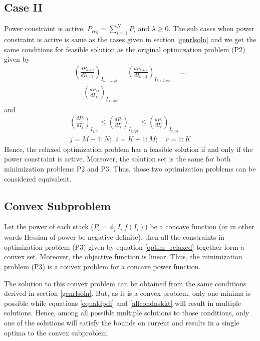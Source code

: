 \documentclass[twocolumn]{autart}
\begin{document}
\subsection*{Case II}
Power constraint is active: $P_{req} = \sum_{i=1}^N P_i$ and $\lambda \geq 0$. 
The sub cases when power constraint is active is same as the cases given in section \ref{genrlsoln} and we get the same conditions for feasible solution as the original optimization problem (P2) given by 
\begin{multline}
\left( \frac{dP_{k+1}}{dI_{k+1}}\right)_{I_{k+1,opt}}=\left( \frac{dP_{k+2}}{dI_{k+2}}\right)_{I_{k+2,opt}}=... \\ =\left( \frac{dP_{M}}{dI_{M}}\right)_{I_{M,opt}}  
\end{multline}
and 
\begin{gather}
\left( \frac{dP_j}{dI_j} \right)_{I_{j,lb}} \leq \left( \frac{dP_i}{dI_i} \right)_{I_{i,opt}} \leq \left( \frac{dP_r}{dI_r} \right)_{I_{r,ub}} \\
j = M+1:N; \ \ i = K+1:M; \quad r = 1:K
\end{gather}
Hence, the relaxed optimization problem has a feasible solution if and only if the power constraint is active. Moreover, the solution set is the same for both minimization problems P2 and P3. Thus, those two optimization problems can be considered equivalent.

\subsection{Convex Subproblem}
Let the power of each stack ($P_i = \phi_i \ I_i \ f(I_i)$) be a concave function (or in other words Hessian of power be negative definite), then all the constraints in optimization problem (P3) given by equation \eqref{optim_relaxed} together form a convex set. Moreover, the objective function is linear. Thus, the minimization problem (P3) is a convex problem for a concave power function.

The solution to this convex problem can be obtained from the same conditions derived in section \ref{genrlsoln}. But, as it is a convex problem, only one minima is possible while equations \ref{equaldpdi} and \ref{allcondnskkt} will result in multiple solutions. Hence, among all possible multiple solutions to those conditions, only one of the solutions will satisfy the bounds on current and results in a single optima to the convex subproblem. 
\end{document}
